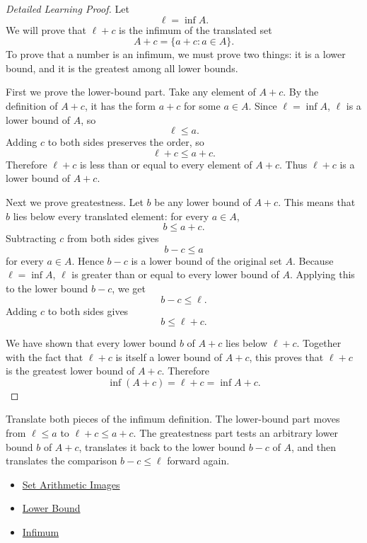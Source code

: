 \begin{proof}[Detailed Learning Proof]
\LRAProofBodyStart
Let
\[
  \ell=\inf A.
\]
We will prove that \(\ell+c\) is the infimum of the translated set
\[
  A+c=\{a+c:a\in A\}.
\]
To prove that a number is an infimum, we must prove two things: it is a lower
bound, and it is the greatest among all lower bounds.

First we prove the lower-bound part. Take any element of \(A+c\). By the
definition of \(A+c\), it has the form \(a+c\) for some \(a\in A\). Since
\(\ell=\inf A\), \(\ell\) is a lower bound of \(A\), so
\[
  \ell\le a.
\]
Adding \(c\) to both sides preserves the order, so
\[
  \ell+c\le a+c.
\]
Therefore \(\ell+c\) is less than or equal to every element of \(A+c\). Thus
\(\ell+c\) is a lower bound of \(A+c\).

Next we prove greatestness. Let \(b\) be any lower bound of \(A+c\). This
means that \(b\) lies below every translated element: for every \(a\in A\),
\[
  b\le a+c.
\]
Subtracting \(c\) from both sides gives
\[
  b-c\le a
\]
for every \(a\in A\). Hence \(b-c\) is a lower bound of the original set
\(A\). Because \(\ell=\inf A\), \(\ell\) is greater than or equal to every
lower bound of \(A\). Applying this to the lower bound \(b-c\), we get
\[
  b-c\le \ell.
\]
Adding \(c\) to both sides gives
\[
  b\le \ell+c.
\]

We have shown that every lower bound \(b\) of \(A+c\) lies below \(\ell+c\).
Together with the fact that \(\ell+c\) is itself a lower bound of \(A+c\),
this proves that \(\ell+c\) is the greatest lower bound of \(A+c\). Therefore
\[
  \inf(A+c)=\ell+c=\inf A+c.
\]
\end{proof}

\begin{remark*}
Translate both pieces of the infimum definition. The lower-bound part moves
from \(\ell\le a\) to \(\ell+c\le a+c\). The greatestness part tests an
arbitrary lower bound \(b\) of \(A+c\), translates it back to the lower bound
\(b-c\) of \(A\), and then translates the comparison \(b-c\le\ell\) forward
again.
\end{remark*}

\begin{dependencies}
\begin{itemize}
  \item \hyperref[def:set-arithmetic-images]{Set Arithmetic Images}
  \item \hyperref[def:real-lower-bound]{Lower Bound}
  \item \hyperref[def:infimum]{Infimum}
\end{itemize}
\end{dependencies}

\clearpage
